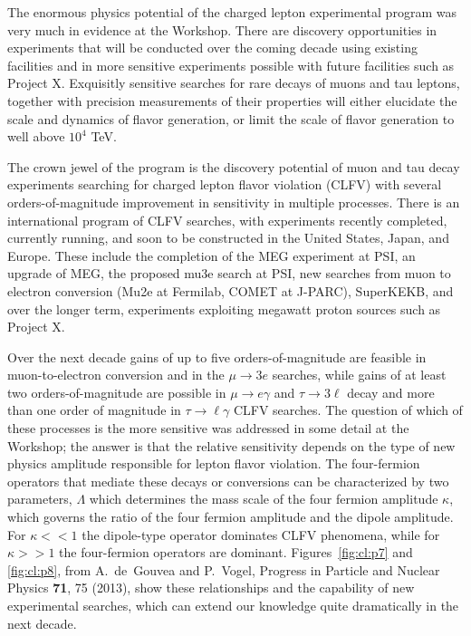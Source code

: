 
The enormous physics potential of the charged
lepton experimental program was very much in evidence at the Workshop. There are discovery opportunities in experiments that will be conducted over the coming decade using existing facilities and in more sensitive experiments possible with future facilities such as Project X.
Exquisitly sensitive searches for rare decays of muons and tau leptons, together with precision measurements of their properties will either elucidate the scale and dynamics of flavor generation, or
limit the scale of flavor generation to well above $10^4$ TeV.  

The crown jewel of the program is the discovery potential of muon and tau decay experiments searching for charged lepton flavor violation (CLFV) with several orders-of-magnitude improvement in sensitivity in
multiple processes.  There is an
international program of CLFV searches, with experiments recently completed, currently running, and
soon to be constructed in the United States, Japan, and Europe.  These include the completion of the MEG experiment at PSI, an upgrade of MEG,  the proposed mu3e search at PSI, new searches from muon to electron conversion (Mu2e at Fermilab, COMET at J-PARC), SuperKEKB, and over the longer term, experiments exploiting megawatt proton sources such as Project X.

Over the next decade
gains of up to five orders-of-magnitude are feasible in
muon-to-electron conversion and in the $\mu \to 3 e$
searches, while gains of at least two orders-of-magnitude
are possible in $\mu \to e\gamma$ and $\tau \to 3\ell$ decay and more than one order of magnitude in $\tau \to \ell\gamma$ CLFV
searches.  The question of which of these processes is the more sensitive was addressed in some detail at the Workshop; the answer is that the relative sensitivity depends on the type of new physics amplitude responsible for lepton flavor violation. 
The four-fermion operators that mediate these decays or conversions can be characterized by two parameters, $\Lambda$ which determines the mass scale of the four fermion amplitude $\kappa$, which governs the ratio of the four fermion amplitude and the dipole amplitude. 
For $\kappa << 1$ the dipole-type operator dominates CLFV phenomena, while for $\kappa >> 1$ the four-fermion
operators are dominant. Figures~\ref{fig:cl:p7} and \ref{fig:cl:p8}, from A.~de~Gouvea and P.~Vogel, Progress in Particle and Nuclear Physics
{\bf 71},  75 (2013), show these relationships and the capability of new experimental searches, which can extend our knowledge quite dramatically in the next decade.


